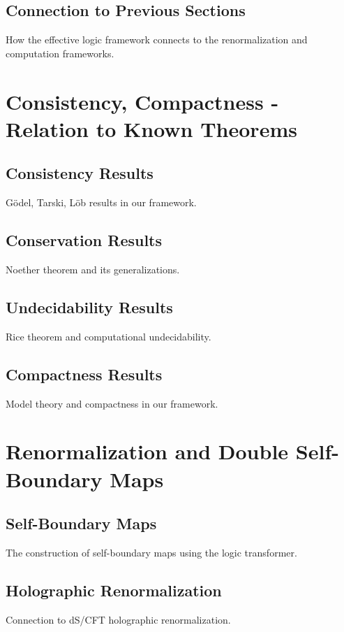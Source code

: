 \documentclass[11pt,a4paper]{article}
\theoremstyle{definition}
\begin{document}
\subsection{Connection to Previous Sections}
How the effective logic framework connects to the renormalization and computation frameworks.

\section{Consistency, Compactness - Relation to Known Theorems}
\label{sec:consistency}

\subsection{Consistency Results}
Gödel, Tarski, Löb results in our framework.

\subsection{Conservation Results}
Noether theorem and its generalizations.

\subsection{Undecidability Results}
Rice theorem and computational undecidability.

\subsection{Compactness Results}
Model theory and compactness in our framework.

\section{Renormalization and Double Self-Boundary Maps}
\label{sec:boundary-maps}

\subsection{Self-Boundary Maps}
The construction of self-boundary maps using the logic transformer.

\subsection{Holographic Renormalization}
Connection to dS/CFT holographic renormalization.
\end{document}
